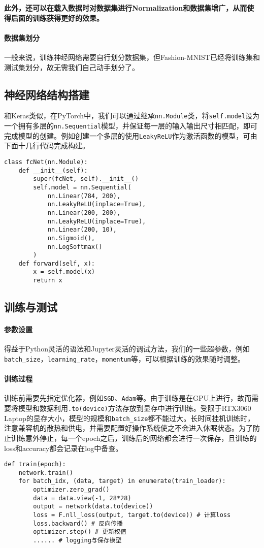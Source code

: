 \documentclass[cn,black,10pt,normal]{elegantnote}
\begin{document}
\textbf{此外，还可以在载入数据时对数据集进行Normalization和数据集增广，从而使得后面的训练获得更好的效果。}

\paragraph{数据集划分} 一般来说，训练神经网络需要自行划分数据集，但Fashion-MNIST已经将训练集和测试集划分，故无需我们自己动手划分了。

\subsection{神经网络结构搭建}
和Keras类似，在PyTorch中，我们可以通过继承\lstinline{nn.Module}类，将\lstinline{self.model}设为一个拥有多层的\lstinline{nn.Sequential}模型，并保证每一层的输入输出尺寸相匹配，即可完成模型的创建。例如创建一个多层的使用\lstinline{LeakyReLU}作为激活函数的模型，可由下面十几行代码完成构建。
\begin{lstlisting}
class fcNet(nn.Module):
    def __init__(self):
        super(fcNet, self).__init__()
        self.model = nn.Sequential(
            nn.Linear(784, 200),
            nn.LeakyReLU(inplace=True),
            nn.Linear(200, 200),
            nn.LeakyReLU(inplace=True),
            nn.Linear(200, 10),
            nn.Sigmoid(),
            nn.LogSoftmax()
        )
    def forward(self, x):
        x = self.model(x)
        return x
\end{lstlisting}


\subsection{训练与测试}

\paragraph{参数设置} 得益于Python灵活的语法和Jupyter灵活的调试方法，我们的一些超参数，例如\lstinline{batch_size}，\lstinline{learning_rate}，\lstinline{momentum}等，可以根据训练的效果随时调整。

\paragraph{训练过程} 训练前需要先指定优化器，例如\lstinline{SGD}、\lstinline{Adam}等。由于训练是在GPU上进行，故而需要将模型和数据利用\lstinline{.to(device)}方法存放到显存中进行训练。受限于RTX3060 Laptop的显存大小，模型的规模和\lstinline{batch_size}都不能过大。长时间挂机训练时，注意兼容机的散热和供电，并需要配置好操作系统使之不会进入休眠状态。为了防止训练意外停止，每一个epoch之后，训练后的网络都会进行一次保存，且训练的loss和accuracy都会记录在log中备查。
\begin{lstlisting}
def train(epoch):
    network.train()
    for batch_idx, (data, target) in enumerate(train_loader):
        optimizer.zero_grad()
        data = data.view(-1, 28*28)
        output = network(data.to(device))
        loss = F.nll_loss(output, target.to(device)) # 计算loss
        loss.backward() # 反向传播
        optimizer.step() # 更新权值
        ...... # logging与保存模型
\end{lstlisting}
\end{document}
